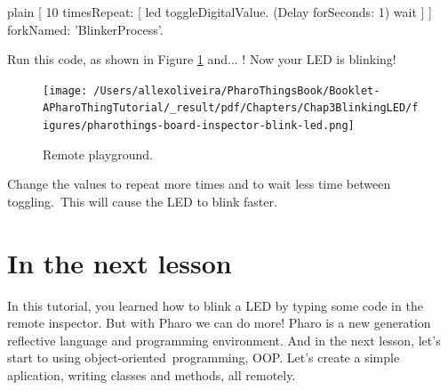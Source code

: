 \documentclass[10pt,twoside,english]{_support/latex/sbabook/sbabook}
\begin{document}
\begin{displaycode}{plain}
[ 10 timesRepeat: [
	led toggleDigitalValue.
 	(Delay forSeconds: 1) wait
] ] forkNamed: 'BlinkerProcess'.
\end{displaycode}

Run this code, as shown in Figure \ref{RemoteInspector} and... ! Now your LED is blinking!


\begin{figure}

\begin{center}
\texttt{[image: /Users/allexoliveira/PharoThingsBook/Booklet-APharoThingTutorial/\_result/pdf/Chapters/Chap3BlinkingLED/figures/pharothings-board-inspector-blink-led.png]}\caption{Remote playground.\label{RemoteInspector}}\end{center}
\end{figure}


Change the values to repeat more times and to wait less time between toggling. This will cause the LED to blink faster.
\section{In the next lesson}
In this tutorial, you learned how to blink a LED by typing some code in the remote inspector. But with Pharo we can do more! Pharo is a new generation reflective language and programming environment. And in the next lesson, let’s start to using object-oriented programming, OOP. Let's create a simple aplication, writing classes and methods, all remotely.


\backmatter

\end{document}
